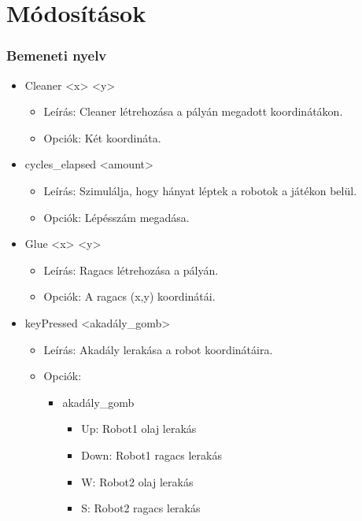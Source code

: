 %
\setcounter{chapter}{-1}

\chapter{Módosítások}

\subsection{Bemeneti nyelv}

\begin{itemize}
	
\item Cleaner <x> <y>
    \begin{itemize}
	\item Leírás: Cleaner létrehozása a pályán megadott koordinátákon.
	\item Opciók: Két koordináta.
	\end{itemize}
	
\item cycles\_elapsed <amount> 
	\begin{itemize}
	\item Leírás: Szimulálja, hogy hányat léptek a robotok a játékon belül.
	\item Opciók: Lépésszám megadása.
	\end{itemize}

\item Glue <x> <y>
	\begin{itemize}
	\item Leírás: Ragacs létrehozása a pályán.
	\item Opciók: A ragacs (x,y) koordinátái.
	\end{itemize}
	
\item keyPressed <akadály\_gomb>
	\begin{itemize}
	\item Leírás: Akadály lerakása a robot koordinátáira.
	\item Opciók: 
	\begin{itemize}
    	    \item akadály\_gomb
        	    \begin{itemize}
        	        \item Up: Robot1 olaj lerakás
        	        \item Down: Robot1 ragacs lerakás
        	        \item W: Robot2 olaj lerakás
        	        \item S: Robot2 ragacs lerakás
        	    \end{itemize}
    	\end{itemize}
	\end{itemize}
	

\end{itemize}
